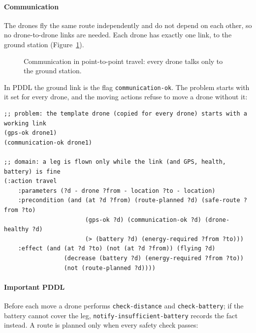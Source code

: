 \documentclass[11pt,a4paper,oneside]{report}
\newcommand{\code}[1]{\texttt{#1}}
\begin{document}
\paragraph{Communication}
The drones fly the same route independently and do not depend on each other, so no
drone-to-drone links are needed. Each drone has exactly one link, to the ground station
(Figure~\ref{fig:comm-travel}).

\begin{figure}[H]
\centering
{}
\caption[Communication in point-to-point travel]{Communication in point-to-point travel: every
drone talks only to the ground station.}
\label{fig:comm-travel}
\end{figure}

\noindent In PDDL the ground link is the flag \code{communication-ok}. The problem starts with it
set for every drone, and the moving actions refuse to move a drone without it:

\begin{lstlisting}
;; problem: the template drone (copied for every drone) starts with a working link
(gps-ok drone1)
(communication-ok drone1)

;; domain: a leg is flown only while the link (and GPS, health, battery) is fine
(:action travel
    :parameters (?d - drone ?from - location ?to - location)
    :precondition (and (at ?d ?from) (route-planned ?d) (safe-route ?from ?to)
                       (gps-ok ?d) (communication-ok ?d) (drone-healthy ?d)
                       (> (battery ?d) (energy-required ?from ?to)))
    :effect (and (at ?d ?to) (not (at ?d ?from)) (flying ?d)
                 (decrease (battery ?d) (energy-required ?from ?to))
                 (not (route-planned ?d))))
\end{lstlisting}

\paragraph{Important PDDL}
Before each move a drone performs \code{check-distance} and \code{check-battery}; if the battery
cannot cover the leg, \code{notify-insufficient-battery} records the fact instead. A route is
planned only when every safety check passes:
\end{document}
